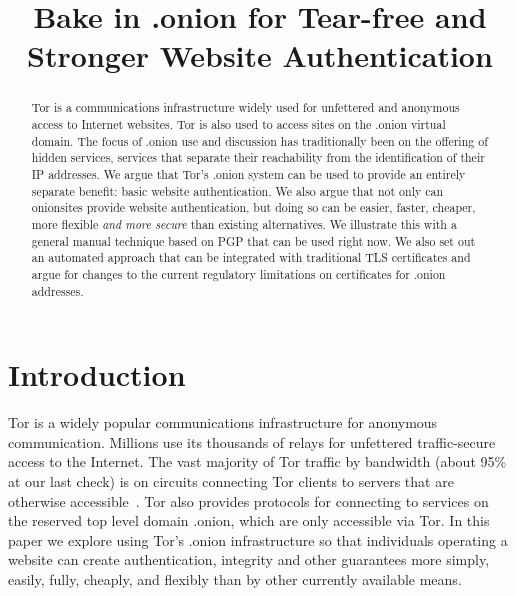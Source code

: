 \documentclass[10pt, conference, compsocconf]{styles/IEEEtran}
\title{Bake in .onion for Tear-free and Stronger Website Authentication}
\author{
\IEEEauthorblockN{Paul Syverson}
\IEEEauthorblockA{U.S. Naval Research Laboratory\\
paul.syverson@nrl.navy.mil}
\and
\IEEEauthorblockN{Griffin Boyce}
\IEEEauthorblockA{Berkman Center for Internet and Society at Harvard University\\
griffin@cryptolab.net}
}
\begin{document}
\maketitle

\begin{abstract}
  Tor is a communications infrastructure widely used for unfettered
  and anonymous access to Internet websites. Tor is also used to
  access sites on the .onion virtual domain.  The focus of .onion use
  and discussion has traditionally been on the offering of hidden
  services, services that separate their reachability from the
  identification of their IP addresses. We argue that Tor's .onion
  system can be used to provide an entirely separate benefit: basic
  website authentication. We also argue that not only can onionsites
  provide website authentication, but doing so can be easier, faster,
  cheaper, more flexible \emph{and more secure} than existing
  alternatives.  We illustrate this with a general manual technique
  based on PGP that can be used right now. We also set out an
  automated approach that can be integrated with traditional TLS
  certificates and argue for changes to the current regulatory
  limitations on certificates for .onion addresses.
\end{abstract}

% 
% 
% 
% 
% 
% 
% 
% 
% 
% 
% 

\section{Introduction}
Tor is a widely popular communications infrastructure for anonymous
communication. Millions use its thousands of relays for unfettered
traffic-secure access to the Internet. The vast majority of Tor
traffic by bandwidth (about 95\% at our last check) is on circuits
connecting Tor clients to servers that are otherwise
accessible~\cite{hs-stats-report-2015}. Tor
also provides protocols for connecting to services on the
reserved top level domain .onion, which are only accessible via Tor.
In this paper we explore using Tor's .onion infrastructure so that
individuals operating a website can create authentication, integrity
and other guarantees more simply, easily, fully, cheaply, and flexibly
than by other currently available means.
\end{document}
